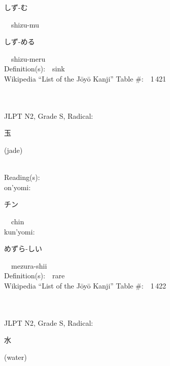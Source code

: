 \begin{multicols}{2}
{\hspace*{2em}}{\begin{CJK}{UTF8}{min} しず-む \end{CJK}}\ \ shizu-mu\ \ \\
{\hspace*{2em}}{\begin{CJK}{UTF8}{min} しず-める \end{CJK}}\ \ shizu-meru\ \ \\
Definition(s):\ \ sink \\
Wikipedia ``List of the J\=oy\=o Kanji'' Table \#:\ \ 1\,421 \\
\ \ \\
{\fontsize{34pt}{40pt}  }\ \ \\  %
{JLPT N2, Grade S, Radical:\ \ {\begin{CJK}{UTF8}{min} 玉 \end{CJK}} (jade) } \\
Reading(s):\ \ \\
{\hspace*{1em}}on'yomi:\ \ \\
{\hspace*{2em}}{\begin{CJK}{UTF8}{min} チン \end{CJK}}\ \ chin\ \ \\
{\hspace*{1em}}kun'yomi:\ \ \\
{\hspace*{2em}}{\begin{CJK}{UTF8}{min} めずら-しい \end{CJK}}\ \ mezura-shii\ \ \\
Definition(s):\ \ rare \\
Wikipedia ``List of the J\=oy\=o Kanji'' Table \#:\ \ 1\,422 \\
\ \ \\
{\fontsize{34pt}{40pt}  }\ \ \\  %
{JLPT N2, Grade S, Radical:\ \ {\begin{CJK}{UTF8}{min} 水 \end{CJK}} (water) } \\

\end{multicols}
